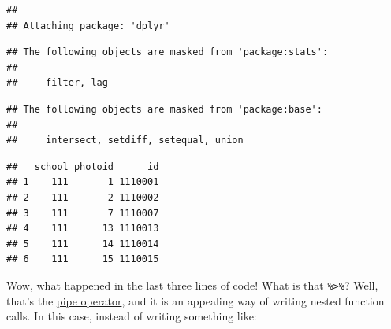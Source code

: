 \documentclass[]{book}
\newenvironment{Shaded}{\begin{snugshade}}{\end{snugshade}}
\newcommand{\DataTypeTok}[1]{\textcolor[rgb]{0.13,0.29,0.53}{#1}}
\newcommand{\DecValTok}[1]{\textcolor[rgb]{0.00,0.00,0.81}{#1}}
\newcommand{\KeywordTok}[1]{\textcolor[rgb]{0.13,0.29,0.53}{\textbf{#1}}}
\newcommand{\NormalTok}[1]{#1}
\newcommand{\OperatorTok}[1]{\textcolor[rgb]{0.81,0.36,0.00}{\textbf{#1}}}
\newcommand{\StringTok}[1]{\textcolor[rgb]{0.31,0.60,0.02}{#1}}
\begin{document}
\begin{verbatim}
## 
## Attaching package: 'dplyr'
\end{verbatim}

\begin{verbatim}
## The following objects are masked from 'package:stats':
## 
##     filter, lag
\end{verbatim}

\begin{verbatim}
## The following objects are masked from 'package:base':
## 
##     intersect, setdiff, setequal, union
\end{verbatim}

\begin{Shaded}
\end{Shaded}

\begin{verbatim}
##   school photoid      id
## 1    111       1 1110001
## 2    111       2 1110002
## 3    111       7 1110007
## 4    111      13 1110013
## 5    111      14 1110014
## 6    111      15 1110015
\end{verbatim}

Wow, what happened in the last three lines of code! What is that \texttt{\%\textgreater{}\%}? Well, that's the \href{http://r4ds.had.co.nz/pipes.html}{pipe operator}, and it is an appealing way of writing nested function calls. In this case, instead of writing something like:

\begin{Shaded}
\end{Shaded}
\end{document}
